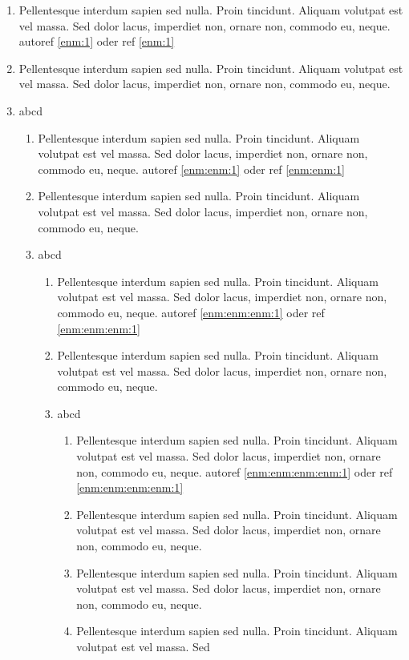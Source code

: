 \documentclass[ngerman]{scrartcl}
\begin{document}
	\begin{enumerate}
		\item Pellentesque interdum sapien sed nulla. Proin tincidunt. Aliquam volutpat est vel massa. Sed
dolor lacus, imperdiet non, ornare non, commodo eu, neque.
					autoref \autoref{enm:1} oder ref \ref{enm:1}
		\item Pellentesque interdum sapien sed nulla. Proin tincidunt. Aliquam volutpat est vel massa. Sed
dolor lacus, imperdiet non, ornare non, commodo eu, neque.\label{enm:1}
		\item abcd
			\begin{enumerate}
				\item Pellentesque interdum sapien sed nulla. Proin tincidunt. Aliquam volutpat est vel massa. Sed
dolor lacus, imperdiet non, ornare non, commodo eu, neque.
							autoref \autoref{enm:enm:1} oder ref \ref{enm:enm:1}
				\item Pellentesque interdum sapien sed nulla. Proin tincidunt. Aliquam volutpat est vel massa. Sed
dolor lacus, imperdiet non, ornare non, commodo eu, neque.\label{enm:enm:1}
				\item abcd
					\begin{enumerate}
						\item Pellentesque interdum sapien sed nulla. Proin tincidunt. Aliquam volutpat est vel massa. Sed
dolor lacus, imperdiet non, ornare non, commodo eu, neque.
									autoref \autoref{enm:enm:enm:1} oder ref \ref{enm:enm:enm:1}
						\item Pellentesque interdum sapien sed nulla. Proin tincidunt. Aliquam volutpat est vel massa. Sed
dolor lacus, imperdiet non, ornare non, commodo eu, neque.\label{enm:enm:enm:1}
						\item abcd
							\begin{enumerate}
								\item Pellentesque interdum sapien sed nulla. Proin tincidunt. Aliquam volutpat est vel massa. Sed
		dolor lacus, imperdiet non, ornare non, commodo eu, neque.
											autoref \autoref{enm:enm:enm:enm:1} oder ref \ref{enm:enm:enm:enm:1}
								\item Pellentesque interdum sapien sed nulla. Proin tincidunt. Aliquam volutpat est vel massa. Sed
		dolor lacus, imperdiet non, ornare non, commodo eu, neque.\label{enm:enm:enm:enm:1}
								\item Pellentesque interdum sapien sed nulla. Proin tincidunt. Aliquam volutpat est vel massa. Sed
		dolor lacus, imperdiet non, ornare non, commodo eu, neque.
								\item Pellentesque interdum sapien sed nulla. Proin tincidunt. Aliquam volutpat est vel massa. Sed

\end{enumerate}
\end{enumerate}
\end{enumerate}
\end{enumerate}
\end{document}
